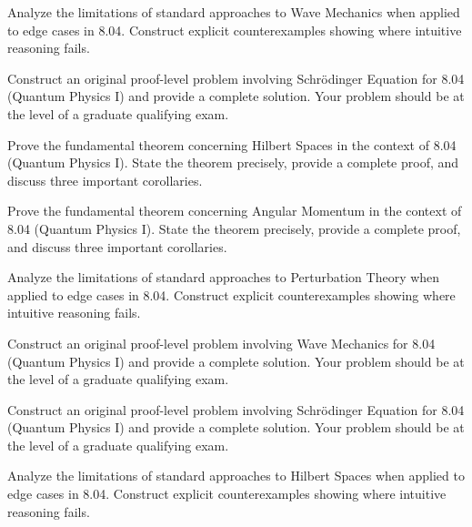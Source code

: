 \documentclass[12pt,a4paper]{exam}
\begin{document}
\begin{questions}

\question[4]
Analyze the limitations of standard approaches to Wave Mechanics when applied to edge cases in 8.04. Construct explicit counterexamples showing where intuitive reasoning fails.

\vspace{0.3cm}

\question[3]
Construct an original proof-level problem involving Schrödinger Equation for 8.04 (Quantum Physics I) and provide a complete solution. Your problem should be at the level of a graduate qualifying exam.

\vspace{0.3cm}

\question[4]
Prove the fundamental theorem concerning Hilbert Spaces in the context of 8.04 (Quantum Physics I). State the theorem precisely, provide a complete proof, and discuss three important corollaries.

\vspace{0.3cm}

\question[5]
Prove the fundamental theorem concerning Angular Momentum in the context of 8.04 (Quantum Physics I). State the theorem precisely, provide a complete proof, and discuss three important corollaries.

\vspace{0.3cm}

\question[4]
Analyze the limitations of standard approaches to Perturbation Theory when applied to edge cases in 8.04. Construct explicit counterexamples showing where intuitive reasoning fails.

\vspace{0.3cm}

\question[4]
Construct an original proof-level problem involving Wave Mechanics for 8.04 (Quantum Physics I) and provide a complete solution. Your problem should be at the level of a graduate qualifying exam.

\vspace{0.3cm}

\question[5]
Construct an original proof-level problem involving Schrödinger Equation for 8.04 (Quantum Physics I) and provide a complete solution. Your problem should be at the level of a graduate qualifying exam.

\vspace{0.3cm}

\question[9]
Analyze the limitations of standard approaches to Hilbert Spaces when applied to edge cases in 8.04. Construct explicit counterexamples showing where intuitive reasoning fails.


\end{questions}
\end{document}
